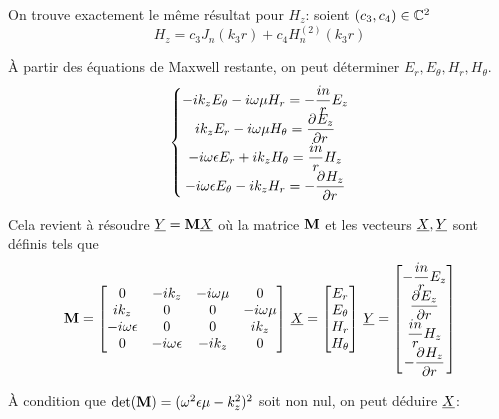     On trouve exactement le même résultat pour $H_z$: soient $(c_3,c_4) \in \CC^2$
    \begin{equation}
        H_z = c_3 J_n\left(k_3r\right) + c_4 H_n^{(2)}\left(k_3r\right)
    \end{equation}

    À partir des équations de Maxwell restante, on peut déterminer $E_r,E_\theta,H_r,H_\theta$.
    \begin{equation}
        \left\lbrace
        \begin{matrix}
            -ik_zE_\theta - i\w\mu H_r = -\frac{in}{r}E_z
            \\
            ik_zE_r - i\w\mu H_\theta = \ddr{r}{E_z}
            \\
            -i\w\eps E_r + ik_z H_\theta = \frac{in}{r}H_z
            \\
            -i\w\eps E_\theta - ik_z H_r = -\ddr{r}{H_z}
        \end{matrix}
        \right.
    \end{equation}

    Cela revient à résoudre $\v{Y}= \mat{M}\v{X}$ où la matrice $\mat{M}$ et les vecteurs $\v{X}, \v{Y}$ sont définis tels que
    \begin{equation}
        \mat{M} =
        \begin{bmatrix}
        0 & -ik_z & -i\w\mu & 0 
        \\
        ik_z & 0 & 0 & -i\w\mu
        \\
        -i\w\eps & 0 & 0 & ik_z
        \\
        0 & -i\w\eps & -ik_z & 0
        \end{bmatrix}
        \,
        \v{X} = 
        \begin{bmatrix}
            E_r\\
            E_\theta\\
            H_r\\
            H_\theta
        \end{bmatrix}
        \,
        \v{Y} = 
        \begin{bmatrix}
            -\frac{in}{r}E_z\\
            \ddr{r}{E_z}\\
            \frac{in}{r}H_z\\
            -\ddr{r}{H_z}
        \end{bmatrix}
    \end{equation}

    À condition que $\det(\mat{M}) = (\w^2\eps\mu-k_z^2)^2$ soit non nul, on peut déduire $\v{X}$:

